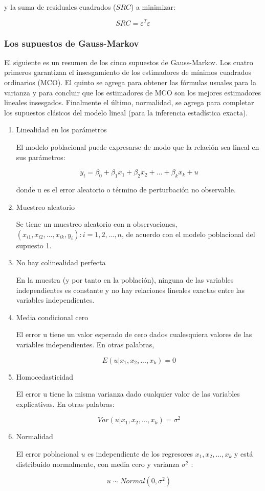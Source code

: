 y la suma de residuales cuadrados ($SRC$) a minimizar:

$$SRC = \varepsilon^{T} \varepsilon $$ 

\subsubsection{Los supuestos de Gauss-Markov} 

El siguiente es un resumen de los cinco supuestos de Gauss-Markov. Los cuatro primeros garantizan el insesgamiento de los estimadores de
mínimos cuadrados ordinarios (MCO). El quinto se agrega para obtener las fórmulas usuales para la varianza y para concluir que los estimadores de MCO son los mejores estimadores lineales insesgados. Finalmente el último, normalidad, se agrega para completar los supuestos clásicos del modelo lineal (para la inferencia estadística exacta).


\begin{enumerate}
	\item Linealidad en los parámetros
	
	El modelo poblacional puede expresarse de modo que la relación sea lineal en sus parámetros: 
	
	$$y_t = \beta_0 + \beta_1 x_1 + \beta_2 x_2 + ... + \beta_k x_k + u$$
	
	donde u es el error aleatorio o término de perturbación no observable.
	
	\item Muestreo aleatorio
	
	Se tiene un muestreo aleatorio con n observaciones, ${(x_{i1} , x_{i2}, ..., x_{ik}, y_i ): i = 1, 2, ..., n} $, de acuerdo con el modelo poblacional del supuesto 1.
	
	
	\item  No hay colinealidad perfecta
	
	En la muestra (y por tanto en la población), ninguna de las variables independientes es constante y no hay relaciones lineales exactas entre las variables independientes.
	
	\item  Media condicional cero
	
	El error u tiene un valor esperado de cero dados cualesquiera valores de las variables independientes.
	En otras palabras,
	
	$$E(u|x_1,x_2, ..., x_k ) = 0$$
	
	\item Homocedasticidad
	
	El error u tiene la misma varianza dado cualquier valor de las variables explicativas. En otras palabras:
	
	$$ Var(u|x_1,x_2, ..., x_k )= \sigma^2 $$
	
	\item Normalidad 
	
	El error poblacional $u$ es independiente de los regresores $x_1,x_2, ..., x_k$ y está distribuido normalmente, con media cero y varianza $\sigma^2$ : 
	
	$$u \sim Normal(0,\sigma^2 )$$
	
\end{enumerate}

